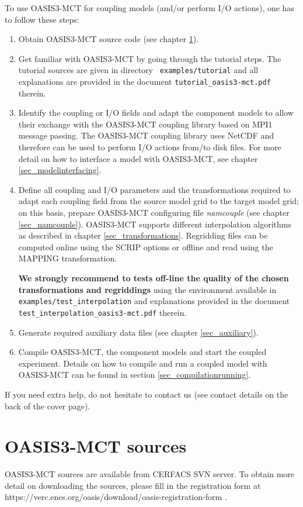 To use OASIS3-MCT for coupling models (and/or perform I/O
actions), one has to follow these steps:
\begin{enumerate}
\item Obtain OASIS3-MCT source code (see chapter \ref{sec_Obtaining}).
\item Get familiar with OASIS3-MCT by going through the tutorial steps. The tutorial sources are given in directory {\tt
  examples/tutorial} and all explanations are provided in the document {\tt tutorial\_oasis3-mct.pdf} therein. 

\item Identify the coupling or I/O fields and adapt the component
  models to allow their exchange with the OASIS3-MCT coupling library based on MPI1 message passing.
  The OASIS3-MCT coupling library uses NetCDF and therefore can be used to perform I/O actions
  from/to disk files.  For more detail on how to interface a model
  with OASIS3-MCT, see chapter \ref{sec_modelinterfacing}.

\item Define all coupling and I/O parameters and the transformations
  required to adapt each coupling field from the source model grid to
  the target model grid; on this basis, prepare OASIS3-MCT configuring file 
  {\it namcouple} (see chapter \ref{sec_namcouple}). 
  OASIS3-MCT supports different interpolation algorithms as described in
  chapter \ref{sec_transformations}.  Regridding files can be computed
  online using the SCRIP options or offline and read using the MAPPING
  transformation.

{\bf We strongly recommend to tests off-line the quality of the chosen transformations and regriddings} using the environment available in {\tt
  examples/test\_interpolation} and explanations provided in the document {\tt test\_interpolation\_oasis3-mct.pdf} therein. 

\item Generate required auxiliary data files (see chapter
  \ref{sec_auxiliary}).
\item Compile OASIS3-MCT, the component models and start the coupled
  experiment. Details on how to compile and run a coupled model with OASIS3-MCT can be found in section \ref{sec_compilationrunning}. 

\end{enumerate}

If you need extra help, do not hesitate to contact us (see contact
details on the back of the cover page).

\section{OASIS3-MCT sources}
\label{sec_Obtaining}
OASIS3-MCT sources are available from CERFACS SVN server. To obtain more detail on downloading
the sources, please fill in the registration form at
https://verc.enes.org/oasis/download/oasis-registration-form .

